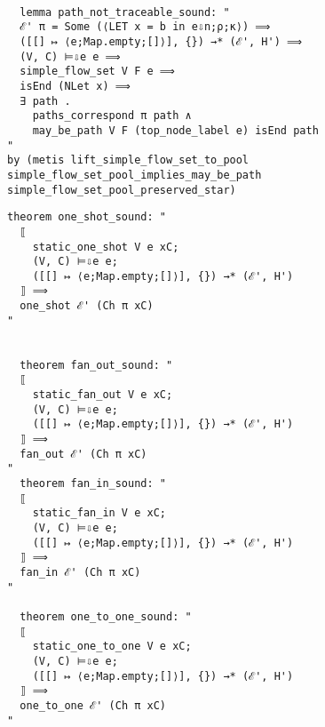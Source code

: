 \documentclass{article}
\begin{document}
\begin{lstlisting}[style=codestyle1, escapechar=\%]

  lemma path_not_traceable_sound: "
  ℰ' π = Some (⟨LET x = b in e⇩n;ρ;κ⟩) ⟹
  ([[] ↦ ⟨e;Map.empty;[]⟩], {}) →* (ℰ', H') ⟹ 
  (V, C) ⊨⇩e e ⟹
  simple_flow_set V F e ⟹
  isEnd (NLet x) ⟹
  ∃ path . 
    paths_correspond π path ∧
    may_be_path V F (top_node_label e) isEnd path
"
by (metis lift_simple_flow_set_to_pool simple_flow_set_pool_implies_may_be_path simple_flow_set_pool_preserved_star)

  \end{lstlisting}



\begin{lstlisting}[style=codestyle1, escapechar=\%]
theorem one_shot_sound: "
  ⟦
    static_one_shot V e xC;
    (V, C) ⊨⇩e e;
    ([[] ↦ ⟨e;Map.empty;[]⟩], {}) →* (ℰ', H')
  ⟧ ⟹
  one_shot ℰ' (Ch π xC)
"


  theorem fan_out_sound: "
  ⟦
    static_fan_out V e xC;
    (V, C) ⊨⇩e e;
    ([[] ↦ ⟨e;Map.empty;[]⟩], {}) →* (ℰ', H')
  ⟧ ⟹
  fan_out ℰ' (Ch π xC)
"
  theorem fan_in_sound: "
  ⟦
    static_fan_in V e xC;
    (V, C) ⊨⇩e e;
    ([[] ↦ ⟨e;Map.empty;[]⟩], {}) →* (ℰ', H')
  ⟧ ⟹
  fan_in ℰ' (Ch π xC)
"

  theorem one_to_one_sound: "
  ⟦
    static_one_to_one V e xC;
    (V, C) ⊨⇩e e;
    ([[] ↦ ⟨e;Map.empty;[]⟩], {}) →* (ℰ', H')
  ⟧ ⟹
  one_to_one ℰ' (Ch π xC)
"


  \end{lstlisting}
\begin{lstlisting}[style=codestyle1, escapechar=\%]
  \end{lstlisting}
\begin{lstlisting}[style=codestyle1, escapechar=\%]
  \end{lstlisting}
\begin{lstlisting}[style=codestyle1, escapechar=\%]
  \end{lstlisting}
\begin{lstlisting}[style=codestyle1, escapechar=\%]
  \end{lstlisting}
\end{document}
